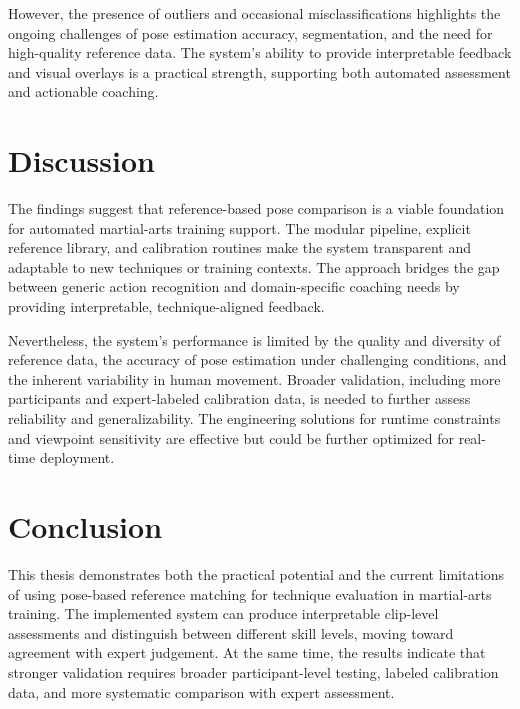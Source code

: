 \documentclass[12pt]{article}
\begin{document}
However, the presence of outliers and occasional misclassifications highlights the ongoing challenges of pose estimation accuracy, segmentation, and the need for high-quality reference data. The system's ability to provide interpretable feedback and visual overlays is a practical strength, supporting both automated assessment and actionable coaching.

\section{Discussion}
The findings suggest that reference-based pose comparison is a viable foundation for automated martial-arts training support. The modular pipeline, explicit reference library, and calibration routines make the system transparent and adaptable to new techniques or training contexts. The approach bridges the gap between generic action recognition and domain-specific coaching needs by providing interpretable, technique-aligned feedback.

Nevertheless, the system's performance is limited by the quality and diversity of reference data, the accuracy of pose estimation under challenging conditions, and the inherent variability in human movement. Broader validation, including more participants and expert-labeled calibration data, is needed to further assess reliability and generalizability. The engineering solutions for runtime constraints and viewpoint sensitivity are effective but could be further optimized for real-time deployment.

\section{Conclusion}
This thesis demonstrates both the practical potential and the current limitations of using pose-based reference matching for technique evaluation in martial-arts training. The implemented system can produce interpretable clip-level assessments and distinguish between different skill levels, moving toward agreement with expert judgement. At the same time, the results indicate that stronger validation requires broader participant-level testing, labeled calibration data, and more systematic comparison with expert assessment.
\end{document}
